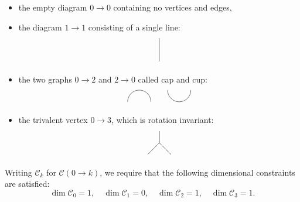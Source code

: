 \documentclass[11pt,oneside]{amsart}
\theoremstyle{plain}%
\theoremstyle{definition}
\theoremstyle{remark}
\begin{document}
\begin{itemize}
	\item the empty diagram $0 \to 0$ containing no vertices and edges,
	\item the diagram $1\to 1$ consisting of a single line:
	\begin{equation}
		\begin{tikzpicture}[scale=0.5]
    	\draw (0, 0) -- (0, 2);
  	\end{tikzpicture}
	\end{equation}
	\item the two graphs $0\to 2$ and $2\to 0$ called cap and cup:
	\begin{equation}
		\begin{tikzpicture}[scale=0.5]
	    \draw (0, 0) arc [start angle=0, end angle=180, radius=1];
	  \end{tikzpicture}\qquad
		\begin{tikzpicture}[scale=0.5]
    	\draw (0, 0) arc [start angle=180, end angle=360, radius=1];
  	\end{tikzpicture}
	\end{equation}
	\item the trivalent vertex $0\to 3$, which is rotation invariant:
	\begin{equation}
		\begin{tikzpicture}[scale=0.5]
    	\draw (0, 2) -- (0, 1);
    	\draw (-1, 0) -- (0, 1) -- (1, 0);
  	\end{tikzpicture}
	\end{equation}
\end{itemize}

Writing $\mathcal{C}_k$ for $\mathcal{C}(0\to k)$, we require that the following dimensional constraints are satisfied:
\begin{equation}
	\dim\mathcal{C}_0=1,\quad \dim\mathcal{C}_1=0,\quad \dim\mathcal{C}_2=1,\quad \dim\mathcal{C}_3=1.
\end{equation}
\end{document}
